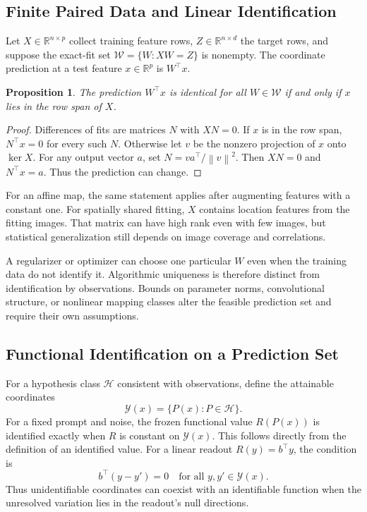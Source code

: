 \documentclass[10pt,twocolumn,letterpaper]{article}
\newtheorem{proposition}{Proposition}
\newcommand{\R}{\mathbb R}\newcommand{\E}{\mathbb E}
\newcommand{\norm}[1]{\left\lVert#1\right\rVert}
\begin{document}
\subsection{Finite Paired Data and Linear Identification}
Let $X\in\R^{n\times p}$ collect training feature rows, $Z\in\R^{n\times d}$ the target rows, and suppose the exact-fit set $\mathcal W=\{W:XW=Z\}$ is nonempty. The coordinate prediction at a test feature $x\in\R^p$ is $W^\top x$.
\begin{proposition}
The prediction $W^\top x$ is identical for all $W\in\mathcal W$ if and only if $x$ lies in the row span of $X$.
\end{proposition}
\begin{proof}
Differences of fits are matrices $N$ with $XN=0$. If $x$ is in the row span, $N^\top x=0$ for every such $N$. Otherwise let $v$ be the nonzero projection of $x$ onto $\ker X$. For any output vector $a$, set $N=va^\top/\norm{v}^2$. Then $XN=0$ and $N^\top x=a$. Thus the prediction can change.
\end{proof}
For an affine map, the same statement applies after augmenting features with a constant one. For spatially shared fitting, $X$ contains location features from the fitting images. That matrix can have high rank even with few images, but statistical generalization still depends on image coverage and correlations.

A regularizer or optimizer can choose one particular $W$ even when the training data do not identify it. Algorithmic uniqueness is therefore distinct from identification by observations. Bounds on parameter norms, convolutional structure, or nonlinear mapping classes alter the feasible prediction set and require their own assumptions.

\subsection{Functional Identification on a Prediction Set}
For a hypothesis class $\mathcal H$ consistent with observations, define the attainable coordinates
\begin{equation}
 \mathcal Y(x)=\{P(x):P\in\mathcal H\}.
\end{equation}
For a fixed prompt and noise, the frozen functional value $R(P(x))$ is identified exactly when $R$ is constant on $\mathcal Y(x)$. This follows directly from the definition of an identified value. For a linear readout $R(y)=b^\top y$, the condition is
\begin{equation}
 b^\top(y-y')=0\quad\text{for all }y,y'\in\mathcal Y(x).
\end{equation}
Thus unidentifiable coordinates can coexist with an identifiable function when the unresolved variation lies in the readout's null directions.
\end{document}
